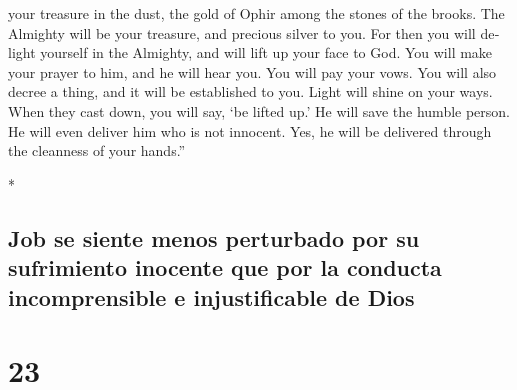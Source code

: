 \begin{paracol}{2}
\begin{otherlanguage}{english}
your treasure in the dust, the gold of Ophir among the stones of the
brooks.  The Almighty will be your treasure, and precious
silver to you.  For then you will delight yourself in the
Almighty, and will lift up your face to God.  You will
make your prayer to him, and he will hear you. You will pay your vows.
 You will also decree a thing, and it will be established
to you. Light will shine on your ways.  When they cast
down, you will say, `be lifted up.' He will save the humble person.
 He will even deliver him who is not innocent. Yes, he
will be delivered through the cleanness of your hands.''

\end{otherlanguage}

\switchcolumn[0]*

\hypertarget{job-se-siente-menos-perturbado-por-su-sufrimiento-inocente-que-por-la-conducta-incomprensible-e-injustificable-de-dios}{%
\subsection{Job se siente menos perturbado por su sufrimiento inocente
que por la conducta incomprensible e injustificable de
Dios}\label{job-se-siente-menos-perturbado-por-su-sufrimiento-inocente-que-por-la-conducta-incomprensible-e-injustificable-de-dios}}

\hypertarget{section-44}{%
\section{23}\label{section-44}}


\end{paracol}
